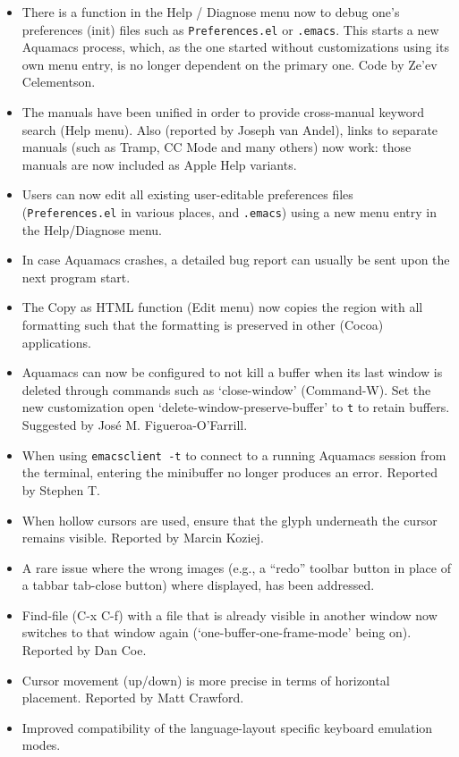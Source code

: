 \begin{itemize}
\item There is a function in the Help / Diagnose menu now to debug one's preferences (init) files such as {\tt Preferences.el} or {\tt .emacs}.  This starts a new Aquamacs process, which, as the one started without customizations using its own menu entry, is no longer dependent on the primary one.
Code by Ze'ev Celementson.
\item The manuals have been unified in order to provide cross-manual keyword search (Help menu).  Also (reported by Joseph van Andel), links to separate manuals (such as Tramp, CC Mode and many others) now work: those manuals are now included as Apple Help variants.
\item Users can now edit all existing user-editable preferences files ({\tt Preferences.el} in various places, and {\tt .emacs}) using a new menu entry in the Help/Diagnose menu.
\item In case Aquamacs crashes, a detailed bug report can usually be sent upon the next program start.
\item The Copy as HTML function (Edit menu) now copies the region with all formatting such that the formatting is preserved in other (Cocoa) applications.
\item Aquamacs can now be configured to not kill a buffer when its last window is deleted through commands such as `close-window' (Command-W).  Set the
new customization open `delete-window-preserve-buffer' to {\tt t} to retain buffers.
Suggested by José M. Figueroa-O'Farrill.
\item When using {\tt emacsclient -t} to connect to a running Aquamacs session from the terminal, entering the minibuffer no longer produces an error.
Reported by Stephen T.
\item When hollow cursors are used, ensure that the glyph underneath the cursor remains visible.
Reported by Marcin Koziej.
\item A rare issue where the wrong images (e.g., a ``redo'' toolbar button in place of a tabbar tab-close button) where displayed, has been addressed.
\item Find-file (C-x C-f) with a file that is already visible in another window now switches to that window again (`one-buffer-one-frame-mode' being on).
Reported by Dan Coe.
\item Cursor movement (up/down) is more precise in terms of horizontal placement.
Reported by Matt Crawford.
\item Improved compatibility of the language-layout specific keyboard emulation modes.

\end{itemize}
